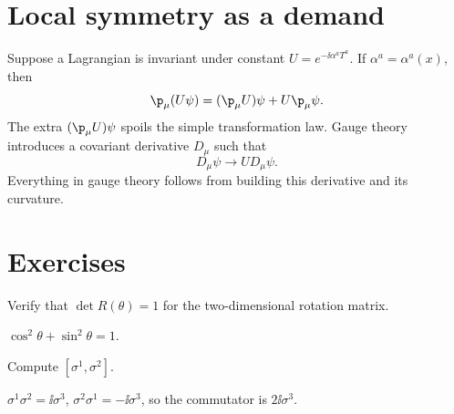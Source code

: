 \section{Local symmetry as a demand}

Suppose a Lagrangian is invariant under constant \(U=e^{-\ii\alpha^aT^a}\).  If \(\alpha^a=\alpha^a(x)\), then
\[
  \p_\mu(U\psi)=(\p_\mu U)\psi+U\p_\mu\psi.
\]
The extra \((\p_\mu U)\psi\) spoils the simple transformation law.  Gauge theory introduces a covariant derivative \(D_\mu\) such that
\[
  D_\mu\psi\to U D_\mu\psi.
\]
Everything in gauge theory follows from building this derivative and its curvature.

\section*{Exercises}

\begin{exercise}
Verify that \(\det R(\theta)=1\) for the two-dimensional rotation matrix.
\begin{answer}
\(\cos^2\theta+\sin^2\theta=1\).
\end{answer}
\end{exercise}

\begin{exercise}
Compute \([\sigma^1,\sigma^2]\).
\begin{answer}
\(\sigma^1\sigma^2=\ii\sigma^3\), \(\sigma^2\sigma^1=-\ii\sigma^3\), so the commutator is \(2\ii\sigma^3\).
\end{answer}
\end{exercise}
